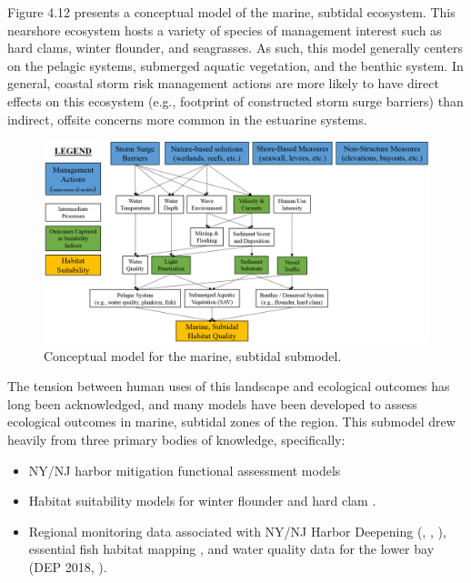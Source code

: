 \documentclass[
]{book}
\begin{document}
Figure 4.12 presents a conceptual model of the marine, subtidal ecosystem. This nearshore ecosystem hosts a variety of species of management interest such as hard clams, winter flounder, and seagrasses. As such, this model generally centers on the pelagic systems, submerged aquatic vegetation, and the benthic system. In general, coastal storm risk management actions are more likely to have direct effects on this ecosystem (e.g., footprint of constructed storm surge barriers) than indirect, offsite concerns more common in the estuarine systems.

\begin{figure}
\includegraphics[width=21.96in]{ZZ_Fig04.12_Mar.Sub_ConModel} \caption{Conceptual model for the marine, subtidal submodel.}\label{fig:unnamed-chunk-20}
\end{figure}

The tension between human uses of this landscape and ecological outcomes has long been acknowledged, and many models have been developed to assess ecological outcomes in marine, subtidal zones of the region. This submodel drew heavily from three primary bodies of knowledge, specifically:

\begin{itemize}
\item
  NY/NJ harbor mitigation functional assessment models \citep{usace_new_2000}
\item
  Habitat suitability models for winter flounder \citep{banner_usfws_2001} and hard clam \citep{mulholland_habitat_1984-1}.
\item
  Regional monitoring data associated with NY/NJ Harbor Deepening (\citet{usace_application_2012}, \citet{usace_demersal_2015a}, \citet{usace_dredge_2015b}), essential fish habitat mapping \citep{usace_essential_2013}, and water quality data for the lower bay (DEP 2018, \citet{usace_dredge_2015b}).
\end{itemize}
\end{document}
